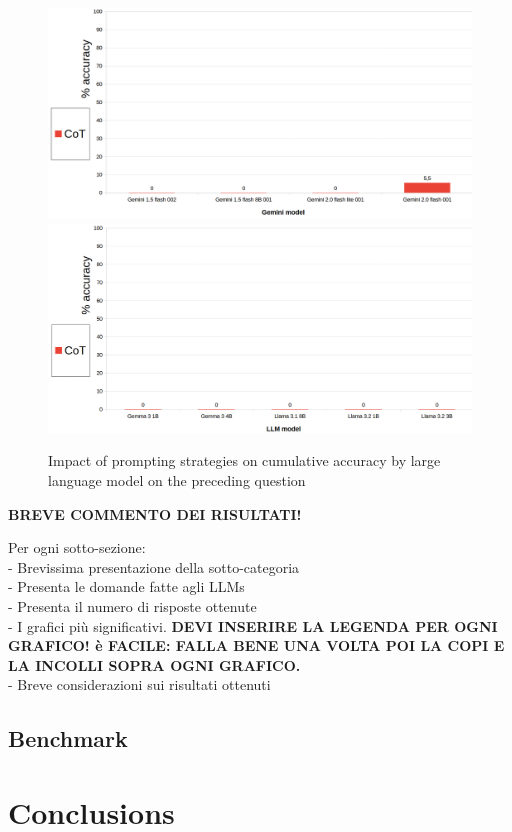 \documentclass[12pt]{article}
\begin{document}
\begin{figure}[H]
    \centering
            \includegraphics[width=1\textwidth]{q309Gemini.png}
            \includegraphics[width=1\textwidth]{q309Other.png}
    \caption[Accuracy on Question 22 by LLM]{Impact of prompting strategies on cumulative accuracy by large language model on the preceding question}
    \end{figure} 
\textbf{BREVE COMMENTO DEI RISULTATI!}

\vspace{1cm}






Per ogni sotto-sezione:\\
- Brevissima presentazione della sotto-categoria\\
- Presenta le domande fatte agli LLMs\\
- Presenta il numero di risposte ottenute\\
- I grafici più significativi. \textbf{DEVI INSERIRE LA LEGENDA PER OGNI GRAFICO! è FACILE: FALLA BENE UNA VOLTA POI LA COPI E LA INCOLLI SOPRA OGNI GRAFICO.}\\
- Breve considerazioni sui risultati ottenuti\\
\subsection{Benchmark}

\clearpage
\section{Conclusions}

\clearpage
\printbibliography
\clearpage
\end{document}
